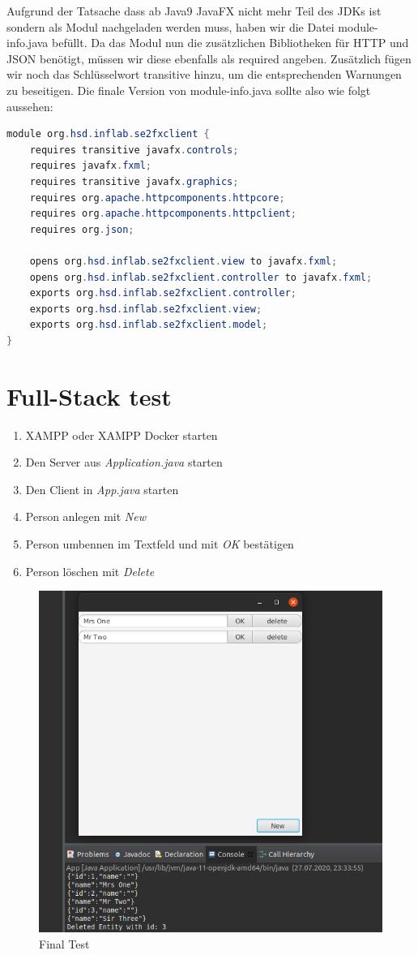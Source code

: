 \documentclass[11pt]{scrartcl}
\begin{document}
Aufgrund der Tatsache dass ab Java9 JavaFX nicht mehr Teil des JDKs ist
sondern als Modul nachgeladen werden muss, haben wir die Datei module-info.java 
befüllt. Da das Modul nun die zusätzlichen Bibliotheken für HTTP und JSON benötigt,
müssen wir diese ebenfalls als required angeben. Zusätzlich fügen wir noch 
das Schlüsselwort transitive hinzu, um die entsprechenden Warnungen zu beseitigen.
Die finale Version von module-info.java sollte also wie folgt aussehen:

\begin{lstlisting}[language=java]
module org.hsd.inflab.se2fxclient {
    requires transitive javafx.controls;
    requires javafx.fxml;
    requires transitive javafx.graphics;
    requires org.apache.httpcomponents.httpcore;
    requires org.apache.httpcomponents.httpclient;
    requires org.json;

    opens org.hsd.inflab.se2fxclient.view to javafx.fxml;
    opens org.hsd.inflab.se2fxclient.controller to javafx.fxml;
    exports org.hsd.inflab.se2fxclient.controller;
    exports org.hsd.inflab.se2fxclient.view;
    exports org.hsd.inflab.se2fxclient.model;
}
\end{lstlisting}

\section{Full-Stack test}
\label{sec:fullstacktest}
\begin{enumerate}
    \item XAMPP oder XAMPP Docker starten
    \item Den Server aus \textit{Application.java} starten
    \item Den Client in \textit{App.java} starten
    \item Person anlegen mit \textit{New}
    \item Person umbennen im Textfeld und mit \textit{OK} bestätigen
    \item Person löschen mit \textit{Delete}
\end{enumerate}

\begin{figure}[!ht]
    \includegraphics[width=\linewidth]{images/eclipse32_final_test.png}
    \caption{Final Test}
    \label{fig:finaltest}
\end{figure}
\end{document}
